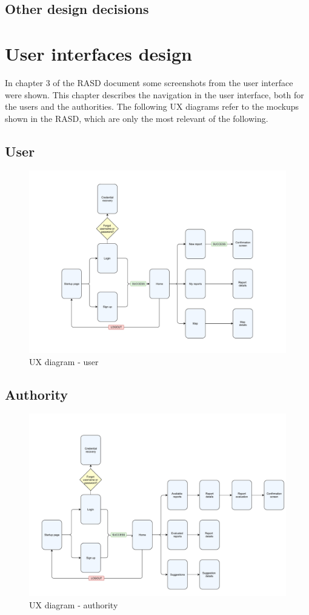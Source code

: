 \documentclass[12pt,a4paper]{report}
\begin{document}
		\section{Other design decisions}

	\chapter{User interfaces design}
	In chapter 3 of the RASD document some screenshots from the user interface were shown. This chapter describes the navigation in the user interface, both for the users and the authorities. The following UX diagrams refer to the mockups shown in the RASD, which are only the most relevant of the following.
	\section{User}
		\begin{figure}[H]
				\includegraphics[scale = 0.65, center]{userux}
				\caption{UX diagram - user}
		\end{figure}
	\section{Authority}
		\begin{figure}[H]
				\includegraphics[scale = 0.6, center]{authorityux}
				\caption{UX diagram - authority}
		\end{figure}
\end{document}
